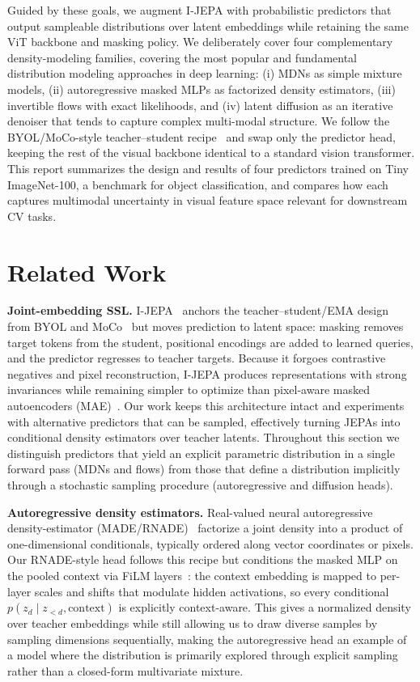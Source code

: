 \documentclass[conference]{IEEEtran}
\begin{document}
Guided by these goals, we augment I-JEPA with probabilistic predictors that output sampleable distributions over latent embeddings while retaining the same ViT backbone and masking policy.
We deliberately cover four complementary density-modeling families, covering the most popular and fundamental distribution modeling approaches in deep learning: (i) MDNs as simple mixture models, (ii) autoregressive masked MLPs as factorized density estimators, (iii) invertible flows with exact likelihoods, and (iv) latent diffusion as an iterative denoiser that tends to capture complex multi-modal structure.
We follow the BYOL/MoCo-style teacher--student recipe~\cite{grill2020byol,chen2020moco} and swap only the predictor head, keeping the rest of the visual backbone identical to a standard vision transformer.
This report summarizes the design and results of four predictors trained on Tiny ImageNet-100, a benchmark for object classification, and compares how each captures multimodal uncertainty in visual feature space relevant for downstream CV tasks.

\section{Related Work}
\textbf{Joint-embedding SSL.}
I-JEPA~\cite{assran2023jepa} anchors the teacher--student/EMA design from BYOL and MoCo~\cite{grill2020byol,chen2020moco,chen2020momentum} but moves prediction to latent space: masking removes target tokens from the student, positional encodings are added to learned queries, and the predictor regresses to teacher targets.
Because it forgoes contrastive negatives and pixel reconstruction, I-JEPA produces representations with strong invariances while remaining simpler to optimize than pixel-aware masked autoencoders (MAE)~\cite{he2022mae}.
Our work keeps this architecture intact and experiments with alternative predictors that can be sampled, effectively turning JEPAs into conditional density estimators over teacher latents.
Throughout this section we distinguish predictors that yield an explicit parametric distribution in a single forward pass (MDNs and flows) from those that define a distribution implicitly through a stochastic sampling procedure (autoregressive and diffusion heads).

\textbf{Autoregressive density estimators.}
Real-valued neural autoregressive density-estimator (MADE/RNADE)~\cite{germain2015made,uria2013rnade} factorize a joint density into a product of one-dimensional conditionals, typically ordered along vector coordinates or pixels.
Our RNADE-style head follows this recipe but conditions the masked MLP on the pooled context via FiLM layers~\cite{perez2018film}: the context embedding is mapped to per-layer scales and shifts that modulate hidden activations, so every conditional $p(z_d \mid z_{<d}, \text{context})$ is explicitly context-aware.
This gives a normalized density over teacher embeddings while still allowing us to draw diverse samples by sampling dimensions sequentially, making the autoregressive head an example of a model where the distribution is primarily explored through explicit sampling rather than a closed-form multivariate mixture.
\end{document}
